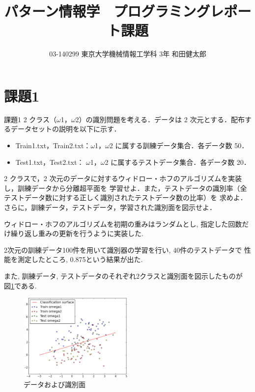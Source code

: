 \documentclass[10pt,a4paper,twocolumn]{jarticle}
\title{パターン情報学　プログラミングレポート課題}
\author{03-140299 東京大学機械情報工学科 3年 和田健太郎}
\begin{document}
\maketitle

\section{課題1}\label{section:kadai1}
\begin{itembox}{課題1}
2 クラス（$\omega$1，$\omega$2）の識別問題を考える．データは 2 次元とする．配布するデータセットの説明を以下に示す．

\begin{itemize}
  \item Train1.txt，Train2.txt：$\omega$1，$\omega$2 に属する訓練データ集合．各データ数 50．
  \item Test1.txt，Test2.txt： $\omega$1，$\omega$2 に属するテストデータ集合．各データ数 20．
\end{itemize}

2 クラスで，2 次元のデータに対するウィドロー・ホフのアルゴリズムを実装し，訓練データから分離超平面を
学習せよ．また，テストデータの識別率（全テストデータ数に対する正しく識別されたテストデータ数の比率）を
求めよ．さらに，訓練データ，テストデータ，学習された識別面を図示せよ．
\end{itembox}
ウィドロー・ホフのアルゴリズムを初期の重みはランダムとし, 
指定した回数だけ繰り返し重みの更新を行うように実装した. 

2次元の訓練データ100件を用いて識別器の学習を行い, 40件のテストデータで
性能を測定したところ, 0.875という結果が出た. 

また, 訓練データ, テストデータのそれぞれ2クラスと識別面を図示したものが
図\ref{fig:kadai1}である. 

\begin{figure}[htbp]
  \centering
  \includegraphics[width=0.5\textwidth]{./assets/kadai1_plot_20150122_031552.eps}
  \caption{データおよび識別面}
  \label{fig:kadai1}
\end{figure}
\end{document}

